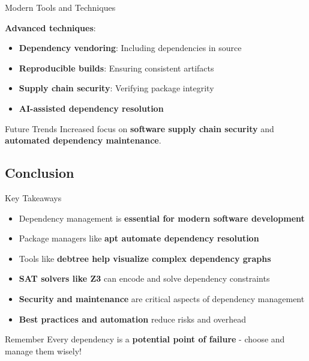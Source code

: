 \documentclass{beamer}
\begin{document}
\begin{frame}[t]{Modern Tools and Techniques}

\bigskip

\textbf{Advanced techniques}:
\begin{itemize}
\item \textbf{Dependency vendoring}: Including dependencies in source
\item \textbf{Reproducible builds}: Ensuring consistent artifacts
\item \textbf{Supply chain security}: Verifying package integrity
\item \textbf{AI-assisted dependency resolution}
\end{itemize}

\bigskip

\begin{block}{Future Trends}
Increased focus on \textbf{software supply chain security} and \textbf{automated dependency maintenance}.
\end{block}
\end{frame}

\subsection{Conclusion}

\begin{frame}[t]{Key Takeaways}
\begin{itemize}
\item Dependency management is \textbf{essential for modern software development}
\item Package managers like \textbf{apt automate dependency resolution}
\item Tools like \textbf{debtree help visualize complex dependency graphs}
\item \textbf{SAT solvers like Z3} can encode and solve dependency constraints
\item \textbf{Security and maintenance} are critical aspects of dependency management
\item \textbf{Best practices and automation} reduce risks and overhead
\end{itemize}

\bigskip

\begin{alertblock}{Remember}
Every dependency is a \textbf{potential point of failure} - choose and manage them wisely!
\end{alertblock}
\end{frame}
\end{document}
